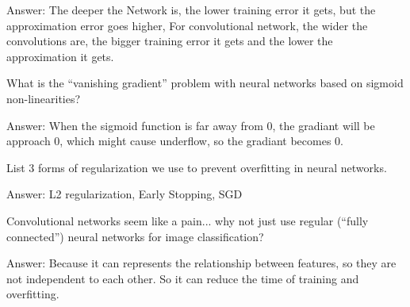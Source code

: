 \documentclass{article}
\def\ans#1{\par\gre{Answer: #1}}
\def\gre#1{{\color{gre}#1}}
\begin{document}
{{\ans{The deeper the Network is, the lower training error it gets, but the approximation error goes higher, For convolutional network, the wider the convolutions are, the bigger training error it gets and the lower the approximation it gets.}
\item What is the ``vanishing gradient'' problem with neural networks based on sigmoid non-linearities?
\ans{When the sigmoid function is far away from 0, the gradiant will be approach 0, which might cause underflow, so the gradiant becomes 0.}
\item List 3 forms of regularization we use to prevent overfitting in neural networks.
\ans{L2 regularization, Early Stopping, SGD}
\item Convolutional networks seem like a pain... why not just use regular (``fully connected'') neural networks for image classification?
\ans{Because it can represents the relationship between features, so they are not independent to each other. So it can reduce the time of training and overfitting.}
}
}
\end{document}
